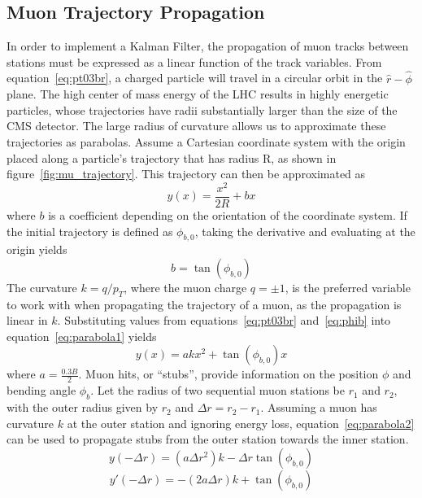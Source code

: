 \subsection{Muon Trajectory Propagation} \label{sec:muons_prop}
In order to implement a Kalman Filter, the propagation of muon tracks between stations must be expressed as a linear function of the track variables. From equation~\ref{eq:pt03br}, a charged particle will travel in a circular orbit in the $\hat{r}-\hat{\phi}$ plane. The high center of mass energy of the LHC results in highly energetic particles, whose trajectories have radii substantially larger than the size of the CMS detector. The large radius of curvature allows us to approximate these trajectories as parabolas. Assume a Cartesian coordinate system with the origin placed along a particle's trajectory that has radius R, as shown in figure~\ref{fig:mu_trajectory}. This trajectory can then be approximated as
\begin{equation}
	\label{eq:parabola1}
	y(x)=\frac{x^2}{2R}+bx
\end{equation}
where $b$ is a coefficient depending on the orientation of the coordinate system. If the initial trajectory is defined as $\phi_{b,0}$, taking the derivative and evaluating at the origin yields
\begin{equation}
	\label{eq:phib}
	b=\tan(\phi_{b,0})
\end{equation}	
The curvature $k=q/p_{T}$, where the muon charge $q=\pm1$, is the preferred variable to work with when propagating the trajectory of a muon, as the propagation is linear in $k$. Substituting values from equations~\ref{eq:pt03br} and~\ref{eq:phib} into equation~\ref{eq:parabola1} yields
\begin{equation}
	\label{eq:parabola2}
	y(x)=akx^2+\tan(\phi_{b,0})x
\end{equation}
where $a=\frac{0.3B}{2}$. Muon hits, or ``stubs'', provide information on the position $\phi$ and bending angle $\phi_b$. Let the radius of two sequential muon stations be $r_1$ and $r_2$, with the outer radius given by $r_2$ and $\Delta r=r_2-r_1$. Assuming a muon has curvature $k$ at the outer station and ignoring energy loss, equation~\ref{eq:parabola2} can be used to propagate stubs from the outer station towards the inner station.
\begin{equation}
	y(-\Delta r) = \left(a\Delta r^2\right)k-\Delta r\tan(\phi_{b,0})
\end{equation}
\begin{equation}
	y'(-\Delta r)=-\left(2a\Delta r\right)k+\tan(\phi_{b,0})
\end{equation}
